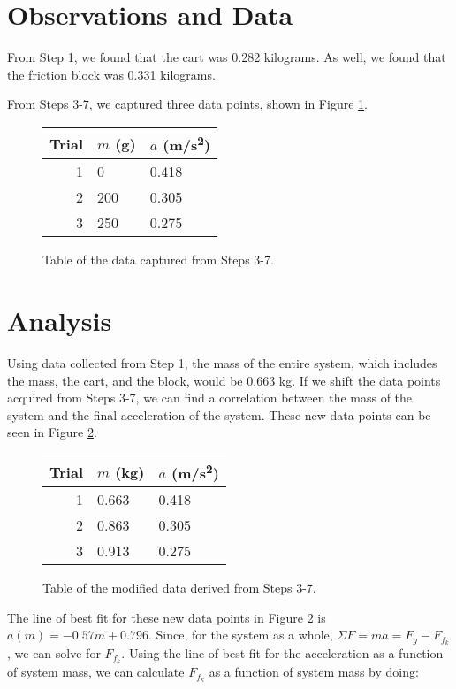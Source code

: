 \documentclass[12pt]{article}
\begin{document}
\section{Observations and Data}

From Step 1, we found that the cart was 0.282 kilograms. As well, we found that
the friction block was 0.331 kilograms.

From Steps 3-7, we captured three data points, shown in Figure \ref{fig:table}.

\begin{figure}[H]
    \centering
    \begin{tabular}{| r | l | l |}
        \hline
        Trial & $m$ (g) & $a$ (m/s\textsuperscript{2}) \\ \hline
        1 & 0 & 0.418 \\
        2 & 200 & 0.305 \\
        3 & 250 & 0.275 \\
        \hline
    \end{tabular}
    \caption{Table of the data captured from Steps 3-7.}
    \label{fig:table}
\end{figure}

\section{Analysis}

Using data collected from Step 1, the mass of the entire system, which includes
the mass, the cart, and the block, would be 0.663 kg. If we shift the data
points acquired from Steps 3-7, we can find a correlation between the mass of
the system and the final acceleration of the system. These new data points can
be seen in Figure \ref{fig:correlation}.

\begin{figure}[h]
    \centering
    \begin{tabular}{| r | l | l |}
        \hline
        Trial & $m$ (kg) & $a$ (m/s\textsuperscript{2}) \\ \hline
        1 & 0.663 & 0.418 \\
        2 & 0.863 & 0.305 \\
        3 & 0.913 & 0.275 \\
        \hline
    \end{tabular}
    \caption{Table of the modified data derived from Steps 3-7.}
    \label{fig:correlation}
\end{figure}

The line of best fit for these new data points in Figure \ref{fig:correlation}
is $a(m) = -0.57m + 0.796$. Since, for the system as a whole, $\Sigma F = ma = F_g
- F_{f_k}$, we can solve for $F_{f_k}$. Using the line of best fit for the
acceleration as a function of system mass, we can calculate $F_{f_k}$ as a
function of system mass by doing:
\end{document}
